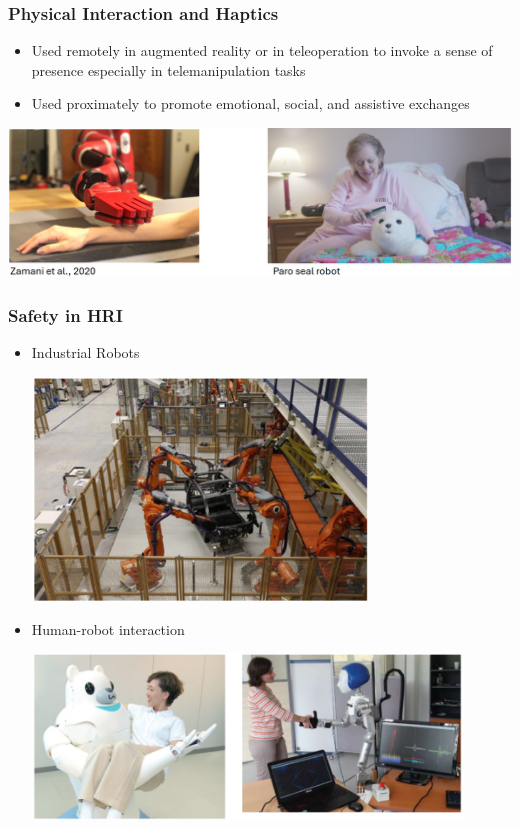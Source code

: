 \documentclass[10pt]{article}
\begin{document}
\subsubsection*{Physical Interaction and Haptics}
\begin{itemize}
	\item Used remotely in augmented reality or in teleoperation to invoke a sense of presence especially in telemanipulation tasks
    \item Used proximately to promote emotional, social, and assistive exchanges
\end{itemize}
\begin{center} 
	\includegraphics*[width=\textwidth]{L1_9.png} 
\end{center}

\subsubsection*{Safety in HRI}
\begin{itemize}
	\item Industrial Robots
	\begin{center} 
        \includegraphics*[width=0.7\textwidth]{L1_10.png} 
    \end{center}
	\item Human-robot interaction
	\begin{center} 
        \includegraphics*[width=0.9\textwidth]{L1_11.png} 
    \end{center}
\end{itemize}
\end{document}
